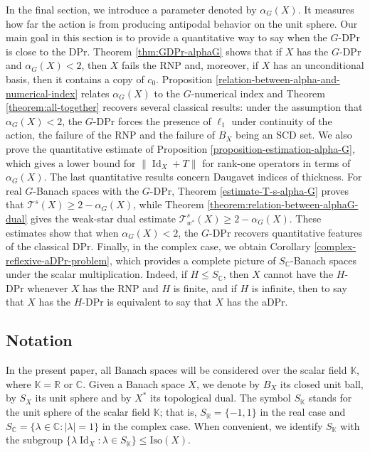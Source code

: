 \documentclass[a4paper,12pt]{amsart}
\theoremstyle{definition}
\theoremstyle{definition}
\theoremstyle{remark}
\numberwithin{equation}{section}
\newcommand{\R}{\mathbb{R}}
\newcommand{\C}{\mathbb{C}}
\newcommand{\K}{\mathbb{K}}
\newcommand{\Iso}{\mathrm{Iso}}
\DeclareMathOperator{\id}{Id}
\renewcommand{\geq}{\geqslant}
\renewcommand{\leq}{\leqslant}
\newcommand{\<}{\langle}
\renewcommand{\>}{\rangle}
\begin{document}
	In the final section, we introduce a parameter denoted by $\alpha_G(X)$. It measures how far the action is from producing antipodal behavior on the unit sphere. Our main goal in this section is to provide a quantitative way to say when the $G$-DPr is close to the DPr. Theorem \ref{thm:GDPr-alphaG} shows that if $X$ has the $G$-DPr and $\alpha_G(X)<2$, then $X$ fails the RNP and, moreover, if $X$ has an unconditional basis, then it contains a copy of $c_0$. Proposition \ref{relation-between-alpha-and-numerical-index} relates $\alpha_G(X)$ to the $G$-numerical index and Theorem \ref{theorem:all-together} recovers several classical results: under the assumption that $\alpha_G(X)<2$, the $G$-DPr forces the presence of $\ell_1$ under continuity of the action, the failure of the RNP and the failure of $B_X$ being an SCD set. We also prove the quantitative estimate of Proposition \ref{proposition-estimation-alpha-G}, which gives a lower bound for $\|\id_X+T\|$ for rank-one operators in terms of $\alpha_G(X)$. The last quantitative results concern Daugavet indices of thickness. For real $G$-Banach spaces with the $G$-DPr, Theorem \ref{estimate-T-s-alpha-G} proves that $\mathcal T^s(X)\geq 2-\alpha_G(X)$, while Theorem \ref{theorem:relation-between-alphaG-dual} gives the weak-star dual estimate $\mathcal T^s_{w^*}(X)\geq 2-\alpha_G(X)$. These estimates show that when $\alpha_G(X)<2$, the $G$-DPr recovers quantitative features of the classical DPr. Finally, in the complex case, we obtain Corollary \ref{complex-reflexive-aDPr-problem}, which provides a complete picture of $S_{\C}$-Banach spaces under the scalar multiplication. Indeed, if $H \leq S_{\C}$, then $X$ cannot have the $H$-DPr whenever $X$ has the RNP and $H$ is finite, and if $H$ is infinite, then to say that $X$ has the $H$-DPr is equivalent to say that $X$ has the aDPr.
	
	
	\subsection{Notation} In the present paper, all Banach spaces will be considered over the scalar field $\K$, where $\K=\R$ or $\C$. Given a Banach space $X$, we denote by $B_X$ its closed unit ball, by $S_X$ its unit sphere and by $X^*$ its topological dual. The symbol $S_{\K}$ stands for the unit sphere of the scalar field $\K$; that is, $S_{\R}=\{-1,1\}$ in the real case and $S_{\C}=\{\lambda\in\C:|\lambda|=1\}$ in the complex case. When convenient, we identify $S_{\K}$ with the subgroup $\{\lambda\id_X:\lambda\in S_{\K}\}\leq \Iso(X)$.
	
\end{document}
